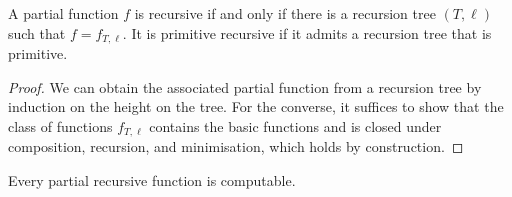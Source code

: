 \begin{theorem}
	A partial function \( f \) is recursive if and only if there is a recursion tree \( (T, \ell) \) such that \( f = f_{T, \ell} \).
	It is primitive recursive if it admits a recursion tree that is primitive.
\end{theorem}
\begin{proof}
	We can obtain the associated partial function from a recursion tree by induction on the height on the tree.
	For the converse, it suffices to show that the class of functions \( f_{T,\ell} \) contains the basic functions and is closed under composition, recursion, and minimisation, which holds by construction.
\end{proof}
\begin{theorem}
	Every partial recursive function is computable.
\end{theorem}
